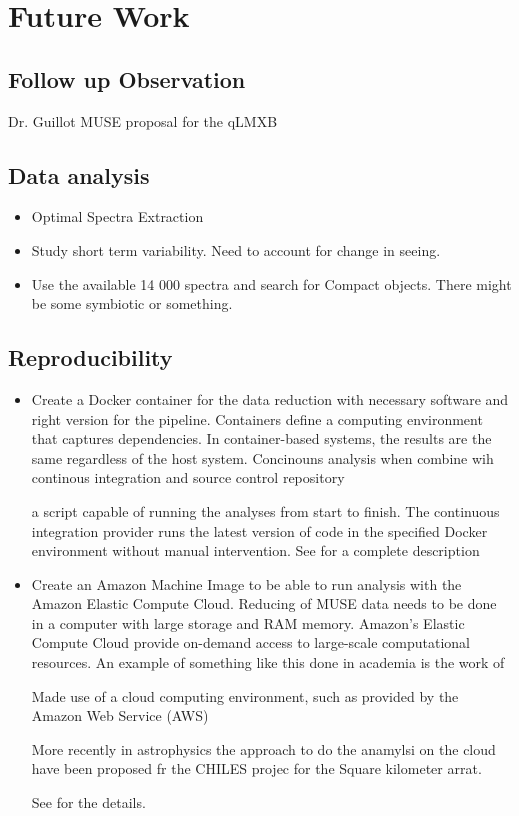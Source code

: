 \chapter{Future Work}\label{chap:future}
\thispagestyle{fancy}

\section{Follow up Observation}

    Dr. Guillot MUSE proposal for the qLMXB
    
\section{Data analysis}
    
    \begin{itemize}
\item Optimal Spectra Extraction \citep{horne_emission_1986}
\item Study short term variability. Need to account for change in seeing.
\item Use the available 14 000 spectra and search for Compact objects. There might be some symbiotic or something. 
\end{itemize}

\section{Reproducibility}
\begin{itemize}
\item  Create a Docker container for the data reduction with necessary software and right version for the pipeline. Containers  define  a   computing   
        environment that    captures    dependencies.   In  container-based systems,    the results are the same    
        regardless  of  the host    system. Concinouns analysis when combine wih continous integration and source control repository

a   script  capable of  running the analyses    from    start   to  finish. The continuous  integration provider runs   
the latest  version of code in  the specified   Docker environment  without manual  intervention.       See \cite{Beaulieu-Jones056473} for a complete description  

\item Create an Amazon Machine Image to be able to run analysis with the Amazon Elastic Compute Cloud. Reducing of MUSE data needs to be done in a computer with large storage and RAM memory. Amazon's Elastic Compute Cloud provide on-demand access to large-scale computational resources. An example of something like this done in academia is the work of \cite{ragan-kelley_collaborative_2013}

Made use of a cloud computing environment, such as provided by the Amazon Web Service (AWS)

More recently in astrophysics the approach to do the anamylsi on the cloud have been proposed fr the CHILES projec for the Square kilometer arrat. 

See \cite{Dodson_SKAAmazon_2016} for the details. 


\end{itemize}

